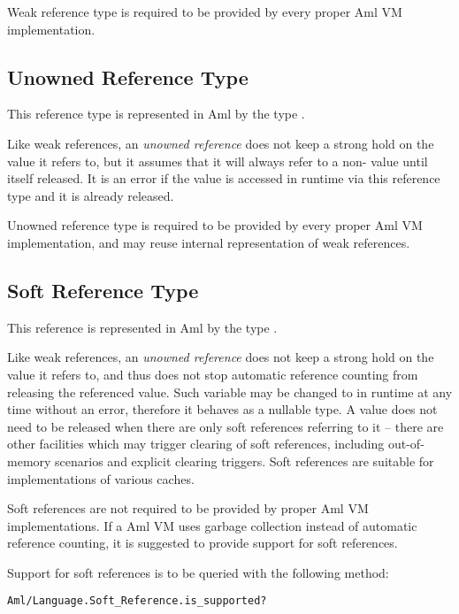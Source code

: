 Weak reference type is required to be provided by every proper Aml VM implementation. 





\subsection{Unowned Reference Type}

This reference type is represented in Aml by the type . 

Like weak references, an {\em unowned reference} does not keep a strong hold on the value it refers to, but it assumes that it will always refer to a non- value until itself released. It is an error if the value is accessed in runtime via this reference type and it is already released. 

Unowned reference type is required to be provided by every proper Aml VM implementation, and may reuse internal representation of weak references. 





\subsection{Soft Reference Type}

This reference is represented in Aml by the type . 

Like weak references, an {\em unowned reference} does not keep a strong hold on the value it refers to, and thus does not stop automatic reference counting from releasing the referenced value. Such variable may be changed to  in runtime at any time without an error, therefore it behaves as a nullable type. A value does not need to be released when there are only soft references referring to it -- there are other facilities which may trigger clearing of soft references, including out-of-memory scenarios and explicit clearing triggers. Soft references are suitable for implementations of various caches. 

Soft references are not required to be provided by proper Aml VM implementations. If a Aml VM uses garbage collection instead of automatic reference counting, it is suggested to provide support for soft references. 

Support for soft references is to be queried with the following method:
\begin{lstlisting}
Aml/Language.Soft_Reference.is_supported?
\end{lstlisting}





